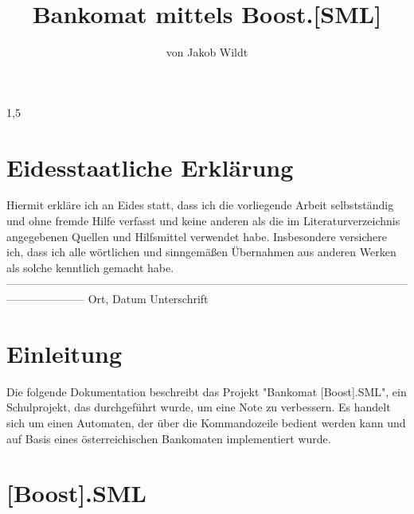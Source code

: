 \documentclass[a4paper]{article}
\title{Bankomat mittels Boost.[SML]}
\author{von Jakob Wildt}
\begin{document}
\maketitle
\large

\begin{center}
\end{center}
\newpage
\begin{spacing}{1,5}


\newpage
\section{Eidesstaatliche Erklärung}

Hiermit erkläre ich an Eides statt, dass ich die vorliegende Arbeit selbstständig und ohne fremde Hilfe verfasst und keine anderen als die im Literaturverzeichnis angegebenen Quellen und Hilfsmittel verwendet habe. Insbesondere versichere ich, dass ich alle wörtlichen und sinngemäßen Übernahmen aus anderen Werken als solche kenntlich gemacht habe.
\newline
\newline
\newline
\newline
\newline
\newline
---------------------------------------------------------------------------------------------------------------------------------
\newline
Ort, Datum
\hspace{300pt}
Unterschrift

\newpage

\tableofcontents

\newpage

\section{Einleitung}

Die folgende Dokumentation beschreibt das Projekt "Bankomat [Boost].SML", ein Schulprojekt, das durchgeführt wurde, um eine Note zu verbessern. \newline
Es handelt sich um einen Automaten, der über die Kommandozeile bedient werden kann und auf Basis eines österreichischen Bankomaten implementiert wurde.  

\newpage

\section{[Boost].SML}


\end{spacing}
\end{document}
